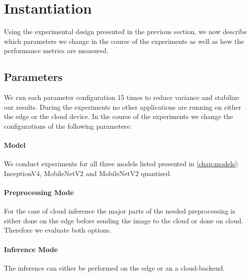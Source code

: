 \section{Instantiation}
Using the experimental design presented in the previous section, we now describe which parameters we change in the course of the experiments as well as how the performance metrics are measured.
\subsection{Parameters}
We run each parameter configuration 15 times to reduce variance and stabilize our results.
During the experiments no other applications are running on either the edge or the cloud device.
In the course of the experiments we change the configurations of the following parameters:
\paragraph{Model}
We conduct experiments for all three models listed presented in \ref{chap:models}: InceptionV4, MobileNetV2 and MobileNetV2 quantized.

\paragraph{Preprocessing Mode}
For the case of cloud inference the major parts of the needed preprocessing is either done on the edge before sending the image to the cloud or done on cloud. Therefore we evaluate both options.
\paragraph{Inference Mode}
The inference can either be performed on the edge or an a cloud-backend.

